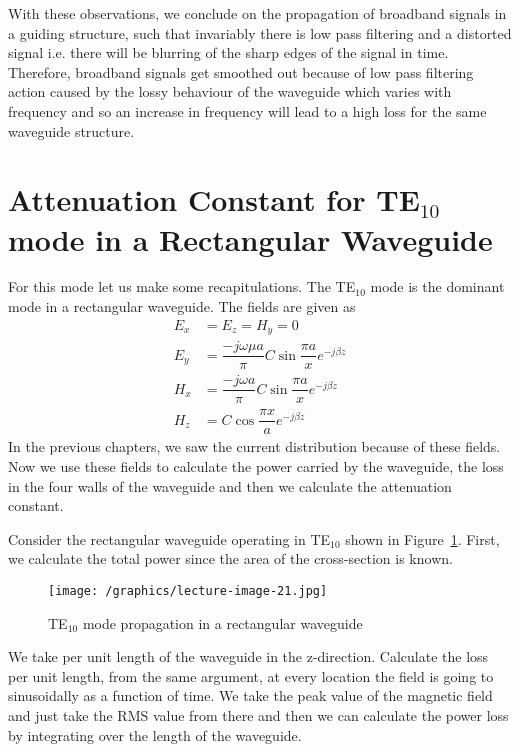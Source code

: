 With these observations, we conclude on the propagation of broadband signals in a guiding structure, such that invariably there is low pass filtering and a distorted signal i.e. there will be blurring of the sharp edges of the signal in time. Therefore, broadband signals get smoothed out because of low pass filtering action caused by the lossy behaviour of the waveguide which varies with frequency and so an increase in frequency will lead to a high loss for the same waveguide structure.

\section{Attenuation Constant for TE$_{10}$ mode in a Rectangular Waveguide}
For this mode let us make some recapitulations. The TE$_{10}$ mode is the dominant mode in a rectangular waveguide. The fields are given as
\begin{align}
E_{x} &= E_{z} = H_{y} = 0\\
E_{y} &= \dfrac{-j\omega\mu a }{\pi}C\sin \dfrac{\pi a}{x} e ^{-j\beta z}\label{eqn:eyrecte10}\\
H_{x} &= \dfrac{-j\omega a}{\pi} C \sin\dfrac{\pi a}{x}
e^{-j\beta z}\label{eqn:hxrecte10}\\
H_{z} &= C\cos \dfrac{\pi x}{a} e^{-j\beta z}\label{eqn:hzrecte10}
\end{align}
In the previous chapters, we saw the current distribution because of these fields. Now we use these fields to calculate the power carried by the waveguide, the loss in the four walls of the waveguide and then we calculate the attenuation constant.

Consider the rectangular waveguide operating in TE$_{10}$ shown in Figure~\ref{fig:lectureimage21}. First, we calculate the total power since the area of the cross-section is known.
\begin{figure}[H]
\centering
\texttt{[image: /graphics/lecture-image-21.jpg]}
\caption{TE$_{10}$ mode propagation in a rectangular waveguide}
\label{fig:lectureimage21}
\end{figure}

We take per unit length of the waveguide in the z-direction. Calculate the loss per unit length, from the same argument, at every location the field is going to sinusoidally as a function of time. We take the peak value of the magnetic field and just take the RMS value from there and then we can calculate the power loss by integrating over the length of the waveguide.

